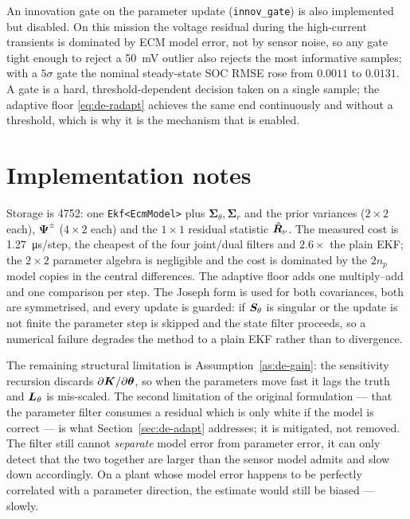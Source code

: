 An innovation gate on the parameter update (\texttt{innov\_gate}) is also implemented but disabled.
On this mission the voltage residual during the high-current transients is dominated by ECM model
error, not by sensor noise, so any gate tight enough to reject a \SI{50}{\milli\volt} outlier also
rejects the most informative samples; with a $5\sigma$ gate the nominal steady-state SOC RMSE rose
from $0.0011$ to $0.0131$.  A gate is a hard, threshold-dependent decision taken on a single sample;
the adaptive floor \eqref{eq:de-radapt} achieves the same end continuously and without a threshold,
which is why it is the mechanism that is enabled.

\section{Implementation notes}
Storage is \SI{4752}{\byte}: one \texttt{Ekf<EcmModel>} plus $\bm{\Sigma}_\theta,\bm{\Sigma}_r$ and
the prior variances ($2\times2$ each), $\bm{\Psi}^\pm$ ($4\times2$ each) and the $1\times1$ residual
statistic $\hat{\bm{R}}_\nu$.  The measured cost is \SI{1.27}{\micro\second}/step, the cheapest of the
four joint/dual filters and $2.6\times$ the plain EKF; the $2\times2$ parameter algebra is negligible
and the cost is dominated by the $2n_p$ model copies in the central differences.  The adaptive floor
adds one multiply--add and one comparison per step.  The Joseph form is used for both covariances,
both are symmetrised, and every update is guarded: if $\bm{S}_\theta$ is singular or the update is not
finite the parameter step is skipped and the state filter proceeds, so a numerical failure degrades
the method to a plain EKF rather than to divergence.

The remaining structural limitation is Assumption~\ref{as:de-gain}: the sensitivity recursion
discards $\partial\bm{K}/\partial\bm{\theta}$, so when the parameters move fast it lags the truth and
$\bm{L}_\theta$ is mis-scaled.  The second limitation of the original formulation --- that the parameter
filter consumes a residual which is only white if the model is correct --- is what
Section~\ref{sec:de-adapt} addresses; it is mitigated, not removed.  The filter still cannot
\emph{separate} model error from parameter error, it can only detect that the two together are
larger than the sensor model admits and slow down accordingly.  On a plant whose model error happens
to be perfectly correlated with a parameter direction, the estimate would still be biased --- slowly.

